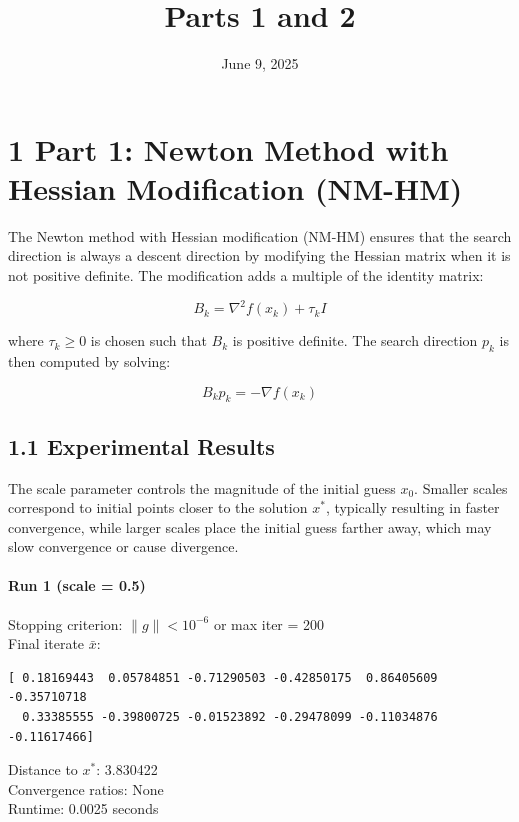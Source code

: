 \documentclass[12pt]{article}
\title{Parts 1 and 2}
\date{June 9, 2025}
\begin{document}
\maketitle

\section*{1 Part 1: Newton Method with Hessian Modification (NM-HM)}

The Newton method with Hessian modification (NM-HM) ensures that the search direction is always a descent direction by modifying the Hessian matrix when it is not positive definite. The modification adds a multiple of the identity matrix:

\begin{equation}
B_k = \nabla^2 f(x_k) + \tau_k I
\end{equation}

where $\tau_k \geq 0$ is chosen such that $B_k$ is positive definite. The search direction $p_k$ is then computed by solving:

\begin{equation}
B_k p_k = -\nabla f(x_k)
\end{equation}

\subsection*{1.1 Experimental Results}

The scale parameter controls the magnitude of the initial guess $x_0$. Smaller scales correspond to initial points closer to the solution $x^*$, typically resulting in faster convergence, while larger scales place the initial guess farther away, which may slow convergence or cause divergence.

\paragraph{Run 1 (scale = 0.5)}
Stopping criterion: $\|g\| < 10^{-6}$ or max iter = 200\\
Final iterate $\bar{x}$:
\begin{verbatim}
[ 0.18169443  0.05784851 -0.71290503 -0.42850175  0.86405609 -0.35710718
  0.33385555 -0.39800725 -0.01523892 -0.29478099 -0.11034876 -0.11617466]
\end{verbatim}
Distance to $x^*$: 3.830422\\
Convergence ratios: None\\
Runtime: 0.0025 seconds
\end{document}
